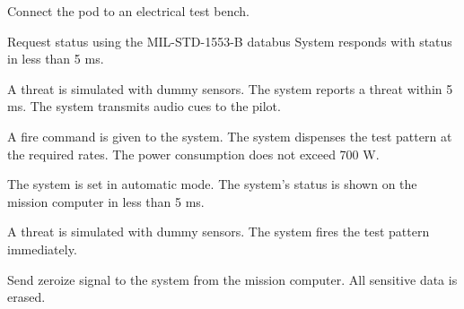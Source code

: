 \documentclass[Main]{subfiles}
\begin{document}
\begin{TestCase}
\TC
{Connect the pod to an electrical test bench.}
{}

\TC
{Request status using the MIL-STD-1553-B databus}
{System responds with status in less than 5 ms.}

\TC
{A threat is simulated with dummy sensors.}
{The system reports a threat within 5 ms.
The system transmits audio cues to the pilot.}


\TC
{A fire command is given to the system.}
{The system dispenses the test pattern at the required rates.
The power consumption does not exceed 700 W.}

\TC
{The system is set in automatic mode.}
{The system's status is shown on the mission computer in less than 5 ms.}

\TC
{A threat is simulated with dummy sensors.}
{The system fires the test pattern immediately.}


\TC
{Send zeroize signal to the system from the mission computer.}
{All sensitive data is erased.}
\end{TestCase}
\end{document}
